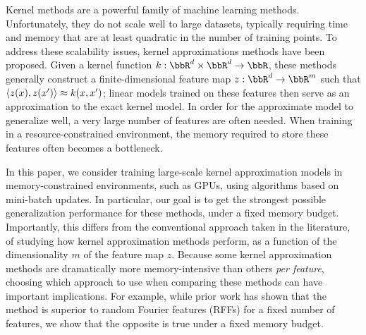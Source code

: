 
Kernel methods are a powerful family of machine learning methods.  Unfortunately, they do not scale well to large datasets, typically requiring time and memory that are at least quadratic in the number of training points. To address these scalability issues, kernel approximations methods have been proposed. Given a kernel function $k:\RR^d\times\RR^d\rightarrow \RR$, these methods generally construct a finite-dimensional feature map $z: \RR^d \rightarrow \RR^m$ such that $\langle z(x),z(x') \rangle \approx k(x,x')$; linear models trained on these features then serve as an approximation to the exact kernel model. In order for the approximate model to generalize well, a very large number of features are often needed. When training in a resource-constrained environment, the memory required to store these features often becomes a bottleneck.

In this paper, we consider training large-scale kernel approximation models in memory-constrained environments, such as GPUs, using algorithms based on mini-batch updates. In particular, our goal is to get the strongest possible generalization performance for these methods, under a fixed memory budget. Importantly, this differs from the conventional approach taken in the literature, of studying how kernel approximation methods perform, as a function of the dimensionality $m$ of the feature map $z$.  Because some kernel approximation methods are dramatically more memory-intensive than others \textit{per feature}, choosing which approach to use when comparing these methods can have important implications.  For example, while prior work \citep{nysvsrff12} has shown that the \Nystrom method \citep{nystrom} is superior to random Fourier features (RFFs) \citep{rahimi07random} for a fixed number of features, we show that the opposite is true under a fixed memory budget. 


